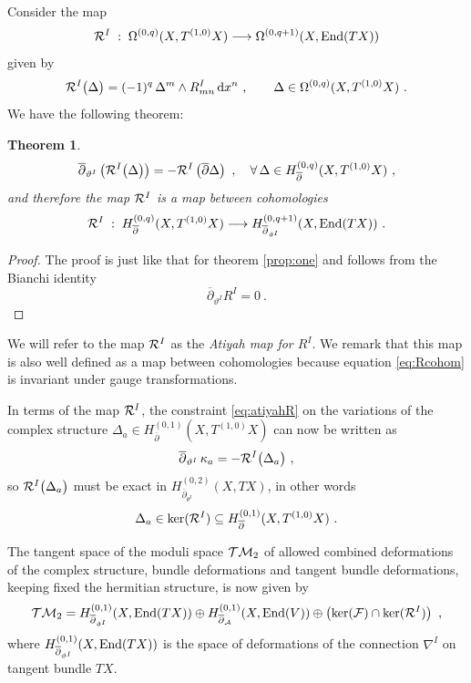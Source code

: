 \documentclass[12pt,a4paper]{article}
\def\bar#1{\overline{#1}}
\def\d{\textrm{d}}
\def\End{\textrm{End}}
\def\ker{\textrm{ker}}
\def\bp{\bar{\partial}}
\newtheorem{Theorem}{Theorem}
\theoremstyle{definition}
\begin{document}
Consider the map 
\begin{equation}
\label{eq:mapR}
{\cal R}^I\;:\;\Omega^{(0,q)}(X,T^{(1,0)}X)\longrightarrow \Omega^{(0,q+1)}(X, {\rm End}(TX))
\end{equation}
given by
\begin{equation}
{\cal R}^I\big(\Delta\big)= (-1)^q\, \Delta{}^m\wedge R^I_{mn}\, \d x^n~,
\qquad \Delta\in\Omega^{(0,q)}(X,T^{(1,0)}X)~.
\label{eq:mapRdef}
\end{equation}
We have the following theorem: 
\begin{Theorem}\label{prop:three}
\begin{equation}
\bp_{\vartheta^I} \left({\cal R}^I\big(\Delta\big)\right) = - {\cal R}^I\left(\bp\Delta\right)~,
\quad\forall\, \Delta\in H_{\bp}^{(0,q)}(X,T^{(1,0)}X)~,
\label{eq:Rcohom}
\end{equation}
and therefore the map ${\cal R}^I$ is a map between cohomologies
\begin{equation}
\label{eq:mapRcohom}
{\cal R}^I\;:\;H_{\bp}^{(0,q)}(X,T^{(1,0)}X)\longrightarrow H_{\bp_{\vartheta^I}}^{(0,q+1)}(X,{\rm End}(TX))~.
\end{equation}
\end{Theorem}
\begin{proof}
The proof is just like that for theorem \ref{prop:one} and follows from the Bianchi identity
\[ \bp_{\vartheta^I} R^I = 0~.\]
\vskip-10pt
\end{proof}
\noindent We will refer to the map ${\cal R}^I$ as the {\it Atiyah map for $R^I$}.
We remark that this map is also well defined as a map between cohomologies because equation \eqref{eq:Rcohom} is invariant under gauge transformations.  

\vskip5pt

In terms of the map ${\cal R}^I$, the constraint \eqref{eq:atiyahR} on the variations of the complex structure 
$\Delta _a\in H_{\bp}^{(0,1)}(X,T^{(1,0)}X)$
can now be written as
\begin{equation}
 \bar\partial_{\vartheta^I}\,\kappa_a = - {\cal R}^I\big(\Delta_a\big)~,\label{eq:atiyahRbis}
 \end{equation}
so  ${\cal R}^I\big(\Delta_a\big)$ must be exact in $H_{\bp_{{\theta}^I}}^{(0,2)}(X,TX)$, in other words
\[ \Delta _a\in \ker({\cal R}^I)\subseteq H_{\bp}^{(0,1)}(X,T^{(1,0)}X)~.\]

The tangent space of the moduli space ${\cal T M}_2$ of allowed combined deformations of the complex structure, bundle deformations and tangent bundle deformations, keeping fixed the hermitian structure, is now given by
\begin{equation}
{\cal T M}_2= H_{\bp_{\vartheta^I}}^{(0,1)}(X,{\rm End}(TX))\oplus
H_{\bp_ {\cal A}}^{(0,1)}(X,\End(V))\oplus \left(\ker({\cal F})\cap\ker({\cal R}^I)\right) ~ ,
\end{equation}
where $H_{\bp_{\vartheta^I}}^{(0,1)}(X,{\rm End}(TX))$ is the space of deformations of the connection $\nabla^I$ on tangent bundle $TX$. \vskip5pt
\end{document}
